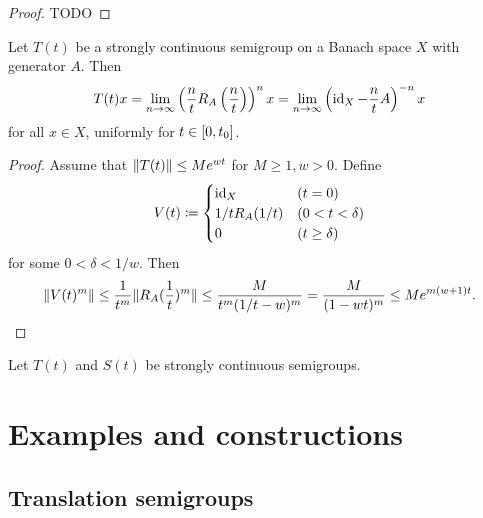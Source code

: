 \begin{proof}
TODO
\end{proof}
\begin{corollary}
Let $T(t)$ be a strongly continuous semigroup on a Banach space $X$ with generator $A$. Then
\[ T(t)x = \lim_{n\to\infty}\left(\frac{n}{t} R_{A}\left(\frac{n}{t}\right)\right)^nx = \lim_{n\to\infty}\left(\operatorname{id}_X - \frac{n}{t} A\right)^{-n}x \]
for all $x\in X$, uniformly for $t\in\interval{0,t_0}$.
\end{corollary}
\begin{proof}
Assume that $\lVert T(t)\rVert\leq Me^{wt}$ for $M\geq 1, w> 0$. Define
\[ V(t) \coloneqq \begin{cases}
\operatorname{id}_X & (t=0) \\
1/t R_A(1/t) & (0<t<\delta) \\
0 & (t\geq \delta)
\end{cases} \]
for some $0<\delta<1/w$. Then
\[ \lVert V(t)^m\rVert \leq \frac{1}{t^m}\lVert R_A(\frac{1}{t})^m\rVert \leq \frac{M}{t^m (1/t - w)^m} = \frac{M}{(1-wt)^m} \leq Me^{m(w+1)t}. \]
\end{proof}
\begin{corollary}
Let $T(t)$ and $S(t)$ be strongly continuous semigroups.
\end{corollary}

\section{Examples and constructions}
\subsection{Translation semigroups}

